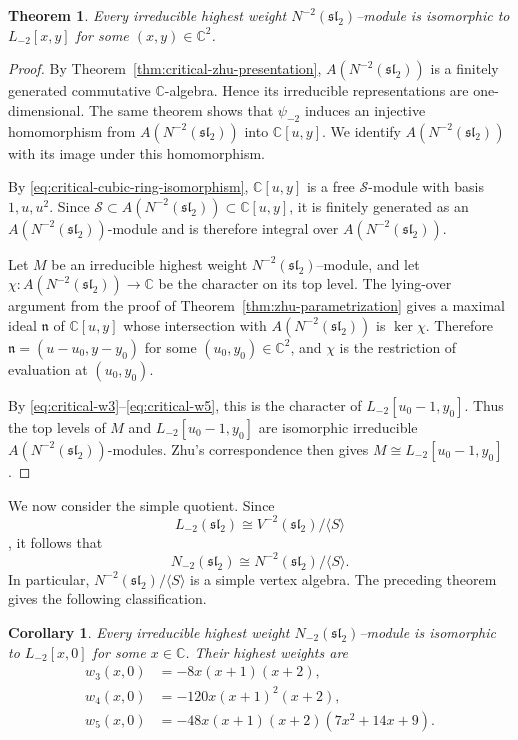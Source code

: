 \documentclass[11 pt]{amsart}
\newtheorem{theorem}{Theorem}
\newtheorem{corollary}{Corollary}
\theoremstyle{definition}
\theoremstyle{plain}
\begin{document}
\begin{theorem}\label{thm:critical-universal-classification}
Every irreducible highest weight
$N^{-2}(\mathfrak{sl}_2)$--module is isomorphic to
$L_{-2}[x,y]$ for some $(x,y)\in\mathbb C^2$.
\end{theorem}

\begin{proof}
By Theorem~\ref{thm:critical-zhu-presentation},
$A(N^{-2}(\mathfrak{sl}_2))$ is a finitely generated
commutative $\mathbb C$-algebra. Hence its irreducible
representations are one-dimensional. The same theorem shows
that $\psi_{-2}$ induces an injective homomorphism from
$A(N^{-2}(\mathfrak{sl}_2))$ into $\mathbb C[u,y]$. We
identify $A(N^{-2}(\mathfrak{sl}_2))$ with its image under
this homomorphism.

By \eqref{eq:critical-cubic-ring-isomorphism},
$\mathbb C[u,y]$ is a free $\mathcal S$-module with basis
$1,u,u^2$. Since
$\mathcal S\subset A(N^{-2}(\mathfrak{sl}_2))
\subset\mathbb C[u,y]$, it is finitely generated as an
$A(N^{-2}(\mathfrak{sl}_2))$-module and is therefore
integral over $A(N^{-2}(\mathfrak{sl}_2))$.

Let $M$ be an irreducible highest weight
$N^{-2}(\mathfrak{sl}_2)$--module, and let
$\chi:A(N^{-2}(\mathfrak{sl}_2))\to\mathbb C$ be the
character on its top level. The lying-over argument from the
proof of Theorem~\ref{thm:zhu-parametrization} gives a
maximal ideal $\mathfrak n$ of $\mathbb C[u,y]$ whose
intersection with $A(N^{-2}(\mathfrak{sl}_2))$ is
$\ker\chi$. Therefore
$\mathfrak n=(u-u_0,y-y_0)$ for some
$(u_0,y_0)\in\mathbb C^2$, and $\chi$ is the restriction of
evaluation at $(u_0,y_0)$.

By \eqref{eq:critical-w3}--\eqref{eq:critical-w5}, this is
the character of $L_{-2}[u_0-1,y_0]$. Thus the top levels of
$M$ and $L_{-2}[u_0-1,y_0]$ are isomorphic irreducible
$A(N^{-2}(\mathfrak{sl}_2))$-modules. Zhu's correspondence
then gives
$M\cong L_{-2}[u_0-1,y_0]$.
\end{proof}

We now consider the simple quotient. Since
\[
L_{-2}(\mathfrak{sl}_2)
\cong V^{-2}(\mathfrak{sl}_2)/\langle S\rangle
\]
\cite[Section~2]{ArakawaCriticalW}, it follows that
\[
N_{-2}(\mathfrak{sl}_2)
\cong N^{-2}(\mathfrak{sl}_2)/\langle S\rangle.
\]
In particular,
$N^{-2}(\mathfrak{sl}_2)/\langle S\rangle$ is a simple vertex
algebra.
The preceding theorem gives the following classification.

\begin{corollary}\label{cor:critical-simple-classification}
Every irreducible highest weight $N_{-2}(\mathfrak{sl}_2)$--module is
isomorphic to $L_{-2}[x,0]$ for some $x\in\mathbb C$.
Their highest weights are
\[
\begin{aligned}
w_3(x,0)&=-8x(x+1)(x+2),\\
w_4(x,0)&=-120x(x+1)^2(x+2),\\
w_5(x,0)&=-48x(x+1)(x+2)(7x^2+14x+9).
\end{aligned}
\]
\end{corollary}
\end{document}

